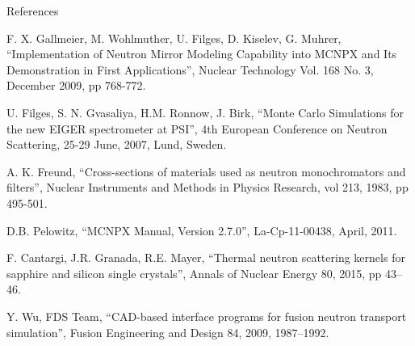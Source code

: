 \documentclass[final,t]{beamer}
\begin{document}
\begin{frame}{}
\begin{columns}[t]
\begin{column}{.3\linewidth}
      \vspace{5ex}


            \begin{block}{References}

      
        \begin{thebibliography}{9}   %
\scriptsize
{}
  F. X. Gallmeier, M. Wohlmuther, U. Filges, D. Kiselev, G. Muhrer,
  ``Implementation of Neutron Mirror Modeling Capability into MCNPX and Its Demonstration in First Applications'',
  Nuclear Technology Vol. 168 No. 3, December 2009, pp 768-772. 

  U. Filges, S. N. Gvasaliya, H.M. Ronnow, J. Birk,
  ``Monte Carlo Simulations for the new EIGER spectrometer at PSI'',
  4th European Conference on Neutron Scattering, 25-29 June, 2007, Lund, Sweden. 

A. K. Freund,
``Cross-sections of materials used as neutron monochromators and filters'',
Nuclear Instruments and Methods in Physics Research, vol 213, 1983, pp 495-501.

   D.B. Pelowitz,
   ``MCNPX Manual, Version 2.7.0'',
   La-Cp-11-00438, April, 2011.

  F. Cantargi, J.R. Granada, R.E. Mayer, 
  ``Thermal neutron scattering kernels for sapphire and silicon single crystals'', 
  Annals of Nuclear Energy 80, 2015, pp 43–46.  

  Y. Wu, FDS Team, 
  ``CAD-based interface programs for fusion neutron transport simulation'', 
  Fusion Engineering and Design 84, 2009, 1987–1992. \\

\end{thebibliography}
      \end{block}


    \end{column}
  \end{columns}



\end{frame}
\end{document}
